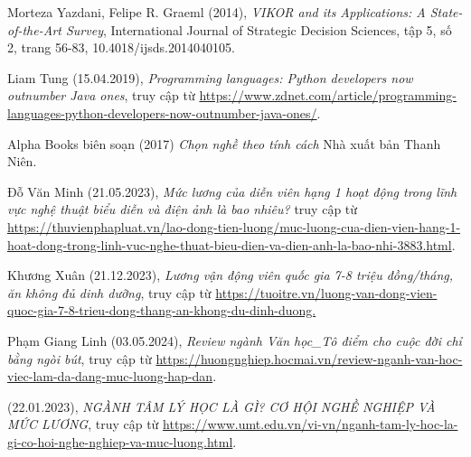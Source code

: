 \begin{thebibliography}{99}
    Morteza Yazdani, Felipe R. Graeml (2014),
    \emph{VIKOR and its Applications: A State-of-the-Art Survey},
    International Journal of Strategic Decision Sciences,
    tập 5, số 2,
    trang 56-83,
    10.4018/ijsds.2014040105.

    
    Liam Tung (15.04.2019),
    \emph{Programming languages: Python developers now outnumber Java ones},
    truy cập từ \href{https://www.zdnet.com/article/programming-languages-python-developers-now-outnumber-java-ones/}{\color{black}https://www.zdnet.com/article/programming-languages-python-developers-now-outnumber-java-ones/}.

    Alpha Books biên soạn (2017)
    \emph{Chọn nghề theo tính cách}
    Nhà xuất bản Thanh Niên.

    Đỗ Văn Minh (21.05.2023),
    \emph{Mức lương của diễn viên hạng 1 hoạt động trong lĩnh vực nghệ thuật biểu diễn và điện ảnh là bao nhiêu?}
    truy cập từ \href{https://thuvienphapluat.vn/lao-dong-tien-luong/muc-luong-cua-dien-vien-hang-1-hoat-dong-trong-linh-vuc-nghe-thuat-bieu-dien-va-dien-anh-la-bao-nhi-3883.html}{\color{black}https://thuvienphapluat.vn/lao-dong-tien-luong/muc-luong-cua-dien-vien-hang-1-hoat-dong-trong-linh-vuc-nghe-thuat-bieu-dien-va-dien-anh-la-bao-nhi-3883.html}.

    Khương Xuân (21.12.2023),
    \emph{Lương vận động viên quốc gia 7-8 triệu đồng/tháng, ăn không đủ dinh dưỡng},
    truy cập từ \href{https://tuoitre.vn/luong-van-dong-vien-quoc-gia-7-8-trieu-dong-thang-an-khong-du-dinh-duong-20231221114836483.htm#:~:text=Theo%20ngh%E1%BB%8B%20%C4%91%E1%BB%8Bnh%20152%20quy,tri%E1%BB%87u%20%C4%91%E1%BB%93ng%2Fng%C6%B0%E1%BB%9Di%2Fth%C3%A1ng.}{\color{black}https://tuoitre.vn/luong-van-dong-vien-quoc-gia-7-8-trieu-dong-thang-an-khong-du-dinh-duong.}

    Phạm Giang Linh (03.05.2024),
    \emph{Review ngành Văn học\_Tô điểm cho cuộc đời chỉ bằng ngòi bút},
    truy cập từ \href{https://huongnghiep.hocmai.vn/review-nganh-van-hoc-viec-lam-da-dang-muc-luong-hap-dan/#:~:text=Hi%E1%BB%87n%20nay%20m%E1%BB%A9c%20l%C6%B0%C6%A1ng%20c%E1%BB%A7a,ph%C3%A1t%20tri%E1%BB%83n%20chuy%C3%AAn%20s%C3%A2u%20h%C6%A1n}{\color{black}https://huongnghiep.hocmai.vn/review-nganh-van-hoc-viec-lam-da-dang-muc-luong-hap-dan}.
    
    (22.01.2023), 
    \emph{NGÀNH TÂM LÝ HỌC LÀ GÌ? CƠ HỘI NGHỀ NGHIỆP VÀ MỨC LƯƠNG},
    truy cập từ \href{https://www.umt.edu.vn/vi-vn/nganh-tam-ly-hoc-la-gi-co-hoi-nghe-nghiep-va-muc-luong.html}{\color{black}https://www.umt.edu.vn/vi-vn/nganh-tam-ly-hoc-la-gi-co-hoi-nghe-nghiep-va-muc-luong.html}.


\end{thebibliography}
